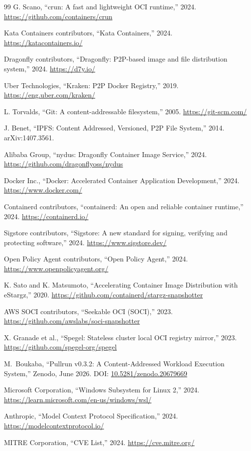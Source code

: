 \documentclass[11pt,a4paper]{article}
\begin{document}
\begin{thebibliography}{99}
G. Scano, ``crun: A fast and lightweight OCI runtime,'' 2024.
\url{https://github.com/containers/crun}

Kata Containers contributors, ``Kata Containers,'' 2024.
\url{https://katacontainers.io/}

Dragonfly contributors, ``Dragonfly: P2P-based image and file distribution system,'' 2024.
\url{https://d7y.io/}

Uber Technologies, ``Kraken: P2P Docker Registry,'' 2019.
\url{https://eng.uber.com/kraken/}

L. Torvalds, ``Git: A content-addressable filesystem,'' 2005.
\url{https://git-scm.com/}

J. Benet, ``IPFS: Content Addressed, Versioned, P2P File System,'' 2014. arXiv:1407.3561.

Alibaba Group, ``nydus: Dragonfly Container Image Service,'' 2024.
\url{https://github.com/dragonflyoss/nydus}

Docker Inc., ``Docker: Accelerated Container Application Development,'' 2024.
\url{https://www.docker.com/}

Containerd contributors, ``containerd: An open and reliable container runtime,'' 2024.
\url{https://containerd.io/}

Sigstore contributors, ``Sigstore: A new standard for signing, verifying and protecting software,'' 2024.
\url{https://www.sigstore.dev/}

Open Policy Agent contributors, ``Open Policy Agent,'' 2024.
\url{https://www.openpolicyagent.org/}

K. Sato and K. Matsumoto, ``Accelerating Container Image Distribution with eStargz,'' 2020.
\url{https://github.com/containerd/stargz-snapshotter}

AWS SOCI contributors, ``Seekable OCI (SOCI),'' 2023.
\url{https://github.com/awslabs/soci-snapshotter}

X. Granade et al., ``Spegel: Stateless cluster local OCI registry mirror,'' 2023.
\url{https://github.com/spegel-org/spegel}

M.~Boukaba, ``Pullrun v0.3.2: A Content-Addressed Workload Execution System,''
Zenodo, June 2026.
\newblock DOI: \href{https://doi.org/10.5281/zenodo.20679669}{10.5281/zenodo.20679669}

Microsoft Corporation, ``Windows Subsystem for Linux 2,'' 2024.
\url{https://learn.microsoft.com/en-us/windows/wsl/}

Anthropic, ``Model Context Protocol Specification,'' 2024.
\url{https://modelcontextprotocol.io/}

MITRE Corporation, ``CVE List,'' 2024.
\url{https://cve.mitre.org/}

\end{thebibliography}
\end{document}
